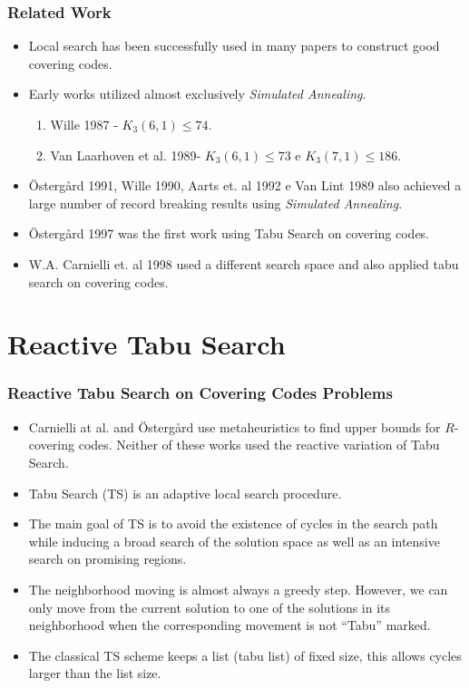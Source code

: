 \documentclass{beamer}
\begin{document}
\begin{frame}
  \frametitle{Related Work}
{
	
\begin{itemize}
  	\item<1-> Local search has been successfully used in many papers to construct
  	good covering codes.
	\item<2-> Early works utilized almost exclusively \textsl{Simulated Annealing}.
		\begin{enumerate}
			\item Wille 1987 - $K_{3}(6,1) \leq 74$.
			\item Van Laarhoven et al. 1989- $K_{3}(6,1) \leq 73$ e $K_{3}(7,1) \leq
		186$.
		\end{enumerate}
	\item<3-> \"Osterg\aa rd 1991, Wille 1990, Aarts et. al 1992 e Van Lint 1989
	also achieved a large number of record breaking results using \textsl{Simulated
	Annealing}.
	\item<4-> \"Osterg\aa rd 1997 was the first work using Tabu Search on covering
	codes.
	\item<5-> W.A. Carnielli et. al 1998 used a different search space and also applied tabu search on covering codes.	
\end{itemize}
}

\end{frame}

\section{Reactive Tabu Search}

\begin{frame}
  \frametitle{Reactive Tabu Search on Covering Codes Problems}
{
	
\begin{itemize}
  	\item<1-> Carnielli at al. and \"Osterg\aa rd use metaheuristics to find upper bounds for $R$-covering codes. Neither of these works used the reactive variation of Tabu Search.	
	\item<2-> Tabu Search (TS) is an adaptive local search procedure.
	\item<3-> The main goal of TS is to avoid the existence of cycles in the search path while inducing a broad search of the solution space as well as an intensive search on promising regions.	
	\item<4-> The neighborhood moving is almost always a greedy step. However, we can only move from the current solution to one of the solutions in its neighborhood when the corresponding movement is not ``Tabu'' marked.	
	\item<5-> The classical TS scheme keeps a list (tabu list) of fixed size, this allows cycles larger than the list size.			
\end{itemize}
}
\end{frame}
\end{document}
